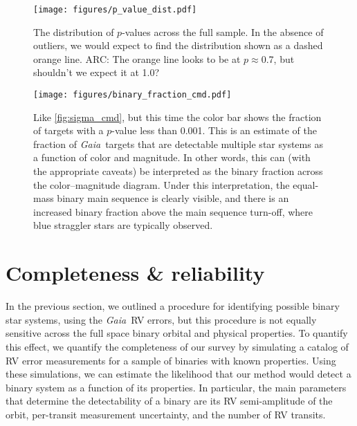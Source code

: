 \documentclass[modern, letterpaper]{aastex631}
\newcommand{\project}[1]{\textsl{#1}}
\newcommand{\Gaia}{\project{Gaia}}
\begin{document}
\begin{figure}
	\begin{centering}
		\texttt{[image: figures/p\_value\_dist.pdf]}
		\caption{The distribution of $p$-values across the full sample. In the absence of outliers, we would expect to find the distribution shown as a dashed orange line. ARC: The orange line looks to be at $p \approx$0.7, but shouldn't we expect it at 1.0?}
		\label{fig:p_value_dist}
	\end{centering}
\end{figure}

\begin{figure}
	\begin{centering}
		\texttt{[image: figures/binary\_fraction\_cmd.pdf]}
		\caption{Like \autoref{fig:sigma_cmd}, but this time the color bar shows the fraction of targets with a $p$-value less than 0.001. This is an estimate of the fraction of \Gaia\ targets that are detectable multiple star systems as a function of color and magnitude. In other words, this can (with the appropriate caveats) be interpreted as the binary fraction across the color--magnitude diagram. Under this interpretation, the equal-mass binary main sequence is clearly visible, and there is an increased binary fraction above the main sequence turn-off, where blue straggler stars are typically observed.}
		\label{fig:binary_fraction_cmd}
	\end{centering}
\end{figure}


\newpage

\section{Completeness \& reliability}

In the previous section, we outlined a procedure for identifying possible binary star systems, using the \Gaia\ RV errors, but this procedure is not equally sensitive across the full space binary orbital and physical properties.
To quantify this effect, we quantify the completeness of our survey by simulating a catalog of RV error measurements for a sample of binaries with known properties.
Using these simulations, we can estimate the likelihood that our method would detect a binary system as a function of its properties.
In particular, the main parameters that determine the detectability of a binary are its RV semi-amplitude of the orbit, per-transit measurement uncertainty, and the number of RV transits.
\end{document}
